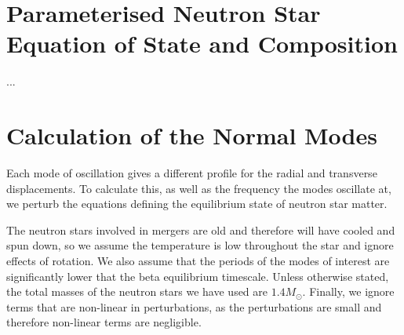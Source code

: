 \documentclass[fleqn,usenatbib]{mnras}
\begin{document}
\section{Parameterised Neutron Star Equation of State and Composition}














...









\section{Calculation of the Normal Modes}
\hspace{\parindent}Each mode of oscillation gives a different profile for the radial and transverse displacements. To calculate this, as well as the frequency the modes oscillate at, we perturb the equations defining the equilibrium state of neutron star matter.

\hspace{\parindent}The neutron stars involved in mergers are old and therefore will have cooled and spun down, so we assume the temperature is low throughout the star and ignore effects of rotation. We also assume that the periods of the modes of interest are significantly lower that the beta equilibrium timescale. Unless otherwise stated, the total masses of the neutron stars we have used are $1.4M_{\odot}$. Finally, we ignore terms that are non-linear in perturbations, as the perturbations are small and therefore non-linear terms are negligible.



\end{document}
